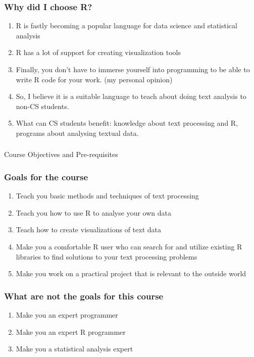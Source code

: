 \documentclass{beamer}
\begin{document}
\begin{frame}
\frametitle{Why did I choose R?}
\begin{enumerate}
\item R is fastly becoming a popular language for data science and statistical analysis
\item R has a lot of support for creating visualization tools
\item Finally, you don't have to immerse yourself into programming to be able to write R code for your work.
(my personal opinion) \pause
\item So, I believe it is a suitable language to teach about doing text analysis to non-CS students.
\item What can CS students benefit: knowledge about text processing and R, programs about analysing textual data. 
\end{enumerate}
\end{frame}

\begin{frame}
\frametitle{}
\begin{center}
\Large Course Objectives and Pre-requisites
\end{center}
\end{frame}

\begin{frame}
\frametitle{Goals for the course}
\begin{enumerate}
\item Teach you basic methods and techniques of text processing
\item Teach you how to use R to analyse your own data
\item Teach how to create visualizations of text data  
\item Make you a comfortable R user who can search for and utilize existing R libraries to find solutions to your text processing problems
\item Make you work on a practical project that is relevant to the outside world
\end{enumerate}
\end{frame}

\begin{frame}
\frametitle{What are not the goals for this course}
\begin{enumerate}
\item Make you an expert programmer
\item Make you an expert R programmer
\item Make you a statistical analysis expert
\end{enumerate}
\end{frame}
\end{document}
